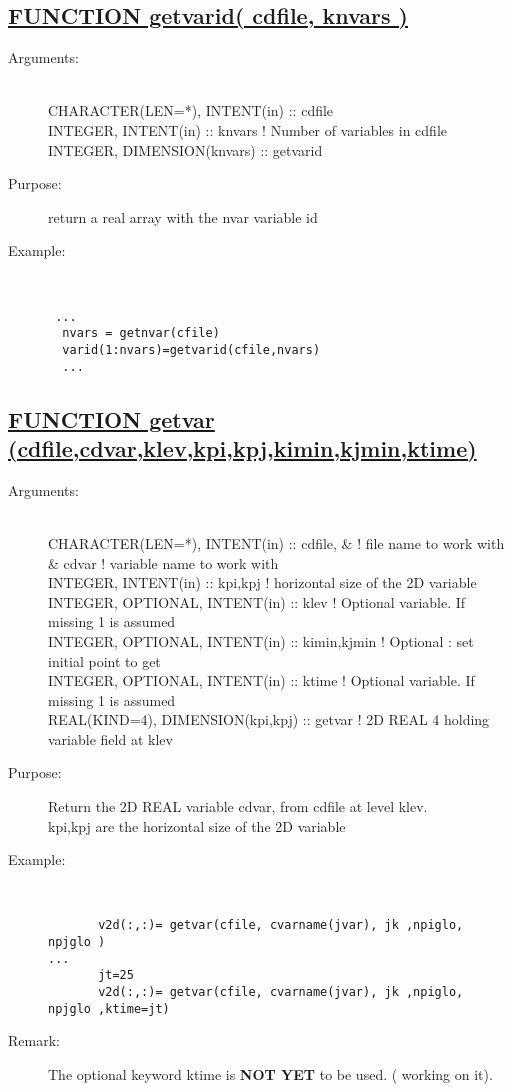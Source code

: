\documentclass[a4paper,11pt]{article}
\begin{document}
\subsection*{\underline{ FUNCTION getvarid( cdfile, knvars ) }}
\begin{description}
\item[Arguments:] \ \\
    CHARACTER(LEN=*), INTENT(in) :: cdfile \\
    INTEGER, INTENT(in)  ::  knvars                  ! Number of variables in cdfile\\
    INTEGER, DIMENSION(knvars) :: getvarid 
\item[Purpose:] return a real array with the nvar variable id
\item[Example:]\ \\
\begin{verbatim}
 ...
  nvars = getnvar(cfile)
  varid(1:nvars)=getvarid(cfile,nvars)
  ...
\end{verbatim}
\end{description}


\newpage
\subsection*{\underline{FUNCTION getvar (cdfile,cdvar,klev,kpi,kpj,kimin,kjmin,ktime)  }}
\begin{description}
\item[Arguments:]\ \\
    CHARACTER(LEN=*), INTENT(in) :: cdfile,     \&   ! file name to work with \\
         \&                          cdvar           ! variable name to work with \\
    INTEGER, INTENT(in) :: kpi,kpj                  ! horizontal size of the 2D variable \\
    INTEGER, OPTIONAL, INTENT(in) :: klev           ! Optional variable. If missing 1 is assumed \\
    INTEGER, OPTIONAL, INTENT(in) :: kimin,kjmin    ! Optional : set initial point to get \\
    INTEGER, OPTIONAL, INTENT(in) :: ktime          ! Optional variable. If missing 1 is assumed \\
    REAL(KIND=4), DIMENSION(kpi,kpj) :: getvar      ! 2D REAL 4 holding variable field at klev 
\item[Purpose:]  Return the 2D REAL variable cdvar, from cdfile at level klev. \\
  kpi,kpj are the horizontal size of the 2D variable
\item[Example:]\ \\
\begin{verbatim}
       v2d(:,:)= getvar(cfile, cvarname(jvar), jk ,npiglo, npjglo )
...
       jt=25
       v2d(:,:)= getvar(cfile, cvarname(jvar), jk ,npiglo, npjglo ,ktime=jt)
\end{verbatim} 
\item[Remark:] The optional keyword ktime is {\bf NOT YET} to be used. ( working on it).
\end{description}
\newpage
\end{document}
